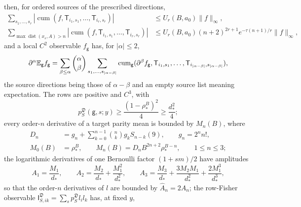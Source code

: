 then, for ordered sources of the prescribed directions,
\begin{equation}
 \begin{split}
 \sum_{s_1,\ldots,s_r}
 |\operatorname{cum}(f,\mathsf T_{i_1,s_1},\ldots,\mathsf T_{i_r,s_r})|
 &\le U_r(B,a_0)\|f\|_\infty,\\
 \sum_{\max\operatorname{dist}(x_s,A)>n}
 |\operatorname{cum}(f,\mathsf T_{i_1,s_1},\ldots,\mathsf T_{i_r,s_r})|
 &\le U_r(B,a_0)(n+2)^{2r+1}e^{-\tau(n+1)/r}\|f\|_\infty,
 \end{split}
 \label{eq:rg-thermo-native-source-tails}
\end{equation}
and a local $C^2$ observable $f_{\mathsf g}$ has, for $|\alpha|\le2$,
\begin{equation}
 \partial^\alpha\mathbb E_{\mathsf g} f_{\mathsf g}=
 \sum_{\beta\le\alpha}\binom{\alpha}{\beta}
 \sum_{s_1,\ldots,s_{|\alpha-\beta|}}
 \operatorname{cum}_{\mathsf g}(\partial^\beta f_{\mathsf g},\mathsf T_{i_1,s_1},\ldots,
                                  \mathsf T_{i_{|\alpha-\beta|},s_{|\alpha-\beta|}}),
 \label{eq:rg-thermo-native-moving-response}
\end{equation}
the source directions being those of $\alpha-\beta$ and an empty source list
meaning expectation. The rows are positive and $C^3$, with
\begin{equation}
 p^{\mathfrak D}_S(\mathsf g,s;y)\ge\frac{(1-\rho_*^B)^2}{4}\ge\frac{d_*^2}{4};
 \label{eq:rg-thermo-native-row-positivity}
\end{equation}
every order-$n$ derivative of a target parity mean is bounded by $M_n(B)$,
where
\begin{equation}
 \begin{split}
 D_n&=g_n+\sum_{k=0}^{n-1}\binom{n}{k}g_kS_{n-k}(9),\qquad g_n=2^nn!,\\
 M_0(B)&=\rho_*^B,\qquad
 M_n(B)=D_nB^{2n+2}\rho_*^{B-n},\qquad 1\le n\le3;
 \end{split}
 \label{eq:rg-thermo-native-parity-jets}
\end{equation}
the logarithmic derivatives of one Bernoulli factor $(1+s m)/2$ have
amplitudes
\begin{equation}
 A_1=\frac{M_1}{d_*},\qquad
 A_2=\frac{M_2}{d_*}+\frac{M_1^2}{d_*^2},\qquad
 A_3=\frac{M_3}{d_*}+\frac{3M_2M_1}{d_*^2}+\frac{2M_1^3}{d_*^3},
 \label{eq:rg-thermo-native-log-amplitudes}
\end{equation}
so that the order-$n$ derivatives of $l$ are bounded by $\widehat A_n=2A_n$;
the row-Fisher observable
$\mathsf I^{\mathfrak D}_{S,ik}=\sum_sp^{\mathfrak D}_Sl_il_k$ has, at fixed $y$,
